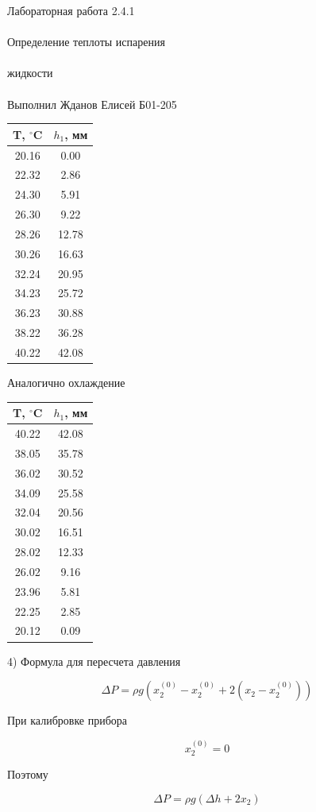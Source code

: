 \documentclass{astroedu-lab}
\begin{document}
\begin{problem}{\huge Лабораторная работа 2.4.1\\\\Определение теплоты испарения\\\\жидкости\\\\Выполнил Жданов Елисей Б01-205}
\begin{center}
\begin{tabular}{|c|c|}
\hline 
T, $^\circ$C  & $h_1$, мм\\
\hline
20.16 & 0.00 \\
22.32 & 2.86 \\
24.30 & 5.91 \\
26.30 & 9.22 \\
28.26 & 12.78 \\
30.26 & 16.63 \\
32.24 & 20.95 \\
34.23 & 25.72 \\
36.23 & 30.88 \\
38.22 & 36.28 \\
40.22 & 42.08 \\
\hline
\end{tabular}
\end{center}

Аналогично охлаждение

\begin{center}
\begin{tabular}{|c|c|}
\hline 
T, $^\circ$C  & $h_1$, мм\\
\hline
40.22 & 42.08 \\
38.05 & 35.78 \\
36.02 & 30.52 \\
34.09 & 25.58 \\
32.04 & 20.56 \\
30.02 & 16.51 \\
28.02 & 12.33 \\
26.02 & 9.16 \\
23.96 & 5.81 \\
22.25 & 2.85 \\
20.12 & 0.09 \\
\hline
\end{tabular}
\end{center}

4) Формула для пересчета давления

\begin{equation}
	\Delta P = \rho g (x_2^{(0)} - x_2^{(0)} + 2(x_2 - x_2^{(0)}))
\end{equation}

При калибровке прибора

\begin{equation}
	x_2^{(0)} = 0
\end{equation}

Поэтому

\begin{equation}
	\Delta P = \rho g (\Delta h + 2 x_2)
\end{equation}


\end{problem}
\end{document}
